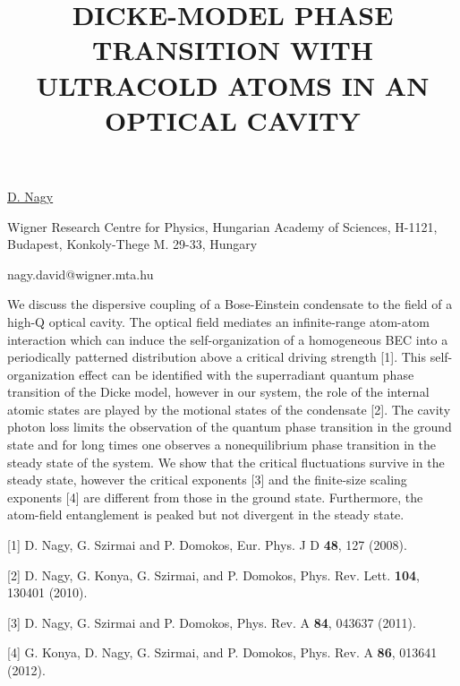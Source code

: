 \title{DICKE-MODEL PHASE TRANSITION WITH ULTRACOLD ATOMS IN AN OPTICAL CAVITY}

\underline{D. Nagy} 

{\normalsize{\vspace{-4mm}
Wigner Research Centre for Physics, Hungarian Academy of Sciences,
H-1121, Budapest, Konkoly-Thege M. 29-33, Hungary

\email nagy.david@wigner.mta.hu}}

We discuss the dispersive coupling of a Bose-Einstein condensate to
the field of a high-Q optical cavity. The optical field mediates
an infinite-range atom-atom interaction which can induce the
self-organization of a homogeneous BEC into a periodically patterned
distribution above a critical driving strength [1]. This
self-organization effect can be identified with the superradiant
quantum phase transition of the Dicke model, however in our system,
the role of the internal atomic states are played by the motional
states of the condensate [2]. The cavity photon loss limits
the observation of the quantum phase transition in the ground state
and for long times one observes a nonequilibrium phase transition in
the steady state of the system. We show that the critical fluctuations
survive in the steady state, however the critical exponents [3] and the
finite-size scaling exponents [4] are different from those in the ground
state. Furthermore, the atom-field entanglement is peaked but not
divergent in the steady state.

{\normalsize
[1] D. Nagy, G. Szirmai and P. Domokos, Eur. Phys. J D \textbf{48}, 127 (2008).
\vsp

[2] D. Nagy, G. Konya, G. Szirmai, and P. Domokos, Phys. Rev. Lett. \textbf{104}, 130401 (2010).
\vsp

[3]  D. Nagy, G. Szirmai and P. Domokos, Phys. Rev. A \textbf{84}, 043637 (2011).
\vsp

[4] G. Konya, D. Nagy, G. Szirmai, and P. Domokos, Phys. Rev. A \textbf{86}, 013641 (2012).
}

\vspace{\baselineskip}
